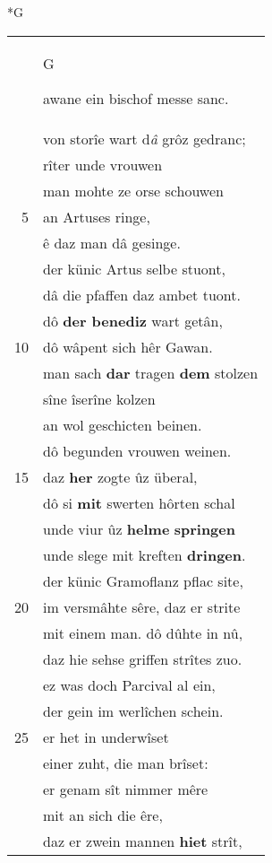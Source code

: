 \documentclass[8pt,a4paper,notitlepage]{article}
\begin{document}
\begin{table}[ht]
\begin{minipage}[t]{0.5\linewidth}
\small
\begin{center}*G
\end{center}
\begin{tabular}{rl}
 & \begin{large}G\end{large}awane ein bischof messe sanc.\\ 
 & von storîe wart d\textit{â} grôz gedranc;\\ 
 & rîter unde vrouwen\\ 
 & man mohte ze orse schouwen\\ 
5 & an Artuses ringe,\\ 
 & ê daz man dâ gesinge.\\ 
 & der künic Artus selbe stuont,\\ 
 & dâ die pfaffen daz ambet tuont.\\ 
 & dô \textbf{der benediz} wart getân,\\ 
10 & dô wâpent sich hêr Gawan.\\ 
 & man sach \textbf{dar} tragen \textbf{dem} stolzen\\ 
 & sîne îserîne kolzen\\ 
 & an wol geschicten beinen.\\ 
 & dô begunden vrouwen weinen.\\ 
15 & daz \textbf{her} zogte ûz überal,\\ 
 & dô si \textbf{mit} swerten hôrten schal\\ 
 & unde viur ûz \textbf{helme} \textbf{springen}\\ 
 & unde slege mit kreften \textbf{dringen}.\\ 
 & der künic Gramoflanz pflac site,\\ 
20 & im versmâhte sêre, daz er strite\\ 
 & mit einem man. dô dûhte in nû,\\ 
 & daz hie sehse griffen strîtes zuo.\\ 
 & ez was doch Parcival al ein,\\ 
 & der gein im werlîchen schein.\\ 
25 & er het in underwîset\\ 
 & einer zuht, die man brîset:\\ 
 & er genam sît nimmer mêre\\ 
 & mit  an sich die êre,\\ 
 & daz er zwein mannen \textbf{hiet} strît,\\ 

\end{tabular}
\end{minipage}
\end{table}
\end{document}
